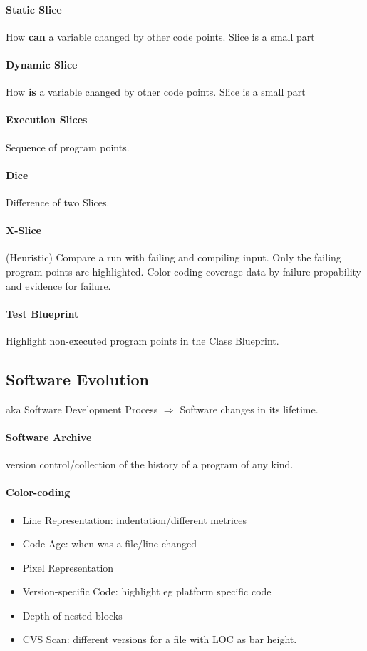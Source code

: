 \documentclass[10pt,a4paper]{article}
\begin{document}
		\paragraph{Static Slice} How \textbf{can} a variable changed by other code points. Slice is a small part
		\paragraph{Dynamic Slice} How \textbf{is} a variable changed by other code points. Slice is a small part
		\paragraph{Execution Slices} Sequence of program points.
		
		\paragraph{Dice} Difference of two Slices.
		
		\paragraph{X-Slice} (Heuristic) Compare a run with failing and compiling input. Only the failing program points are highlighted. Color coding coverage data by failure propability and evidence for failure.
		
		\paragraph{Test Blueprint} Highlight non-executed program points in the Class Blueprint. 
		
	
	\subsection{Software Evolution}
		aka Software Development Process $ \Rightarrow $ Software changes in its lifetime.
		
		\paragraph{Software Archive} version control/collection of the history of a program of any kind. 
		
		\paragraph{Color-coding}
		\begin{itemize}
			\item Line Representation: indentation/different metrices
			\item Code Age: when was a file/line changed
			\item Pixel Representation
			\item Version-specific Code: highlight eg platform specific code
			\item Depth of nested blocks
			\item CVS Scan: different versions for a file with LOC as bar height.
		\end{itemize}
		
\end{document}
